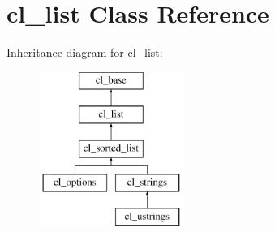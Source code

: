 \hypertarget{classcl__list}{
\section{cl\_\-list Class Reference}
\label{classcl__list}
}
Inheritance diagram for cl\_\-list:\begin{figure}[H]
\begin{center}
\leavevmode
\includegraphics[height=5.000000cm]{classcl__list}
\end{center}
\end{figure}
